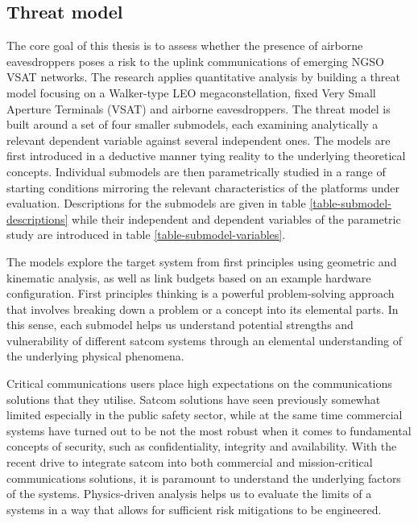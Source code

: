 \documentclass[english, 12pt, a4paper, elec, utf8, a-1b, online]{aaltothesis}
\begin{document}



\subsection{Threat model}

The core goal of this thesis is to assess whether the presence of airborne eavesdroppers poses a risk to the uplink communications of emerging NGSO VSAT networks.
The research applies quantitative analysis by building a threat model focusing on a Walker-type LEO megaconstellation, fixed Very Small Aperture Terminals (VSAT) and airborne eavesdroppers.
The threat model is built around a set of four smaller submodels, each examining analytically a relevant dependent variable against several independent ones.
The models are first introduced in a deductive manner tying reality to the underlying theoretical concepts.
Individual submodels are then parametrically studied in a range of starting conditions mirroring the relevant characteristics of the platforms under evaluation.
Descriptions for the submodels are given in table \ref{table-submodel-descriptions} while their independent and dependent variables of the parametric study are introduced in table \ref{table-submodel-variables}.

The models explore the target system from first principles using geometric and kinematic analysis, as well as link budgets based on an example hardware configuration.
First principles thinking is a powerful problem-solving approach that involves breaking down a problem or a concept into its elemental parts.
In this sense, each submodel helps us understand potential strengths and vulnerability of different satcom systems through an elemental understanding of the underlying physical phenomena. %

Critical communications users place high expectations on the communications solutions that they utilise.
Satcom solutions have seen previously somewhat limited especially in the public safety sector, while at the same time commercial systems have turned out to be not the most robust when it comes to fundamental concepts of security, such as confidentiality, integrity and availability.
With the recent drive to integrate satcom into both commercial and mission-critical communications solutions, it is paramount to understand the underlying factors of the systems. %
Physics-driven analysis helps us to evaluate the limits of a systems in a way that allows for sufficient risk mitigations to be engineered. %
\end{document}
